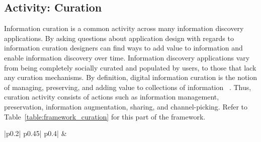 \documentclass[review]{elsarticle}
\begin{document}
{{\subsection{Activity: Curation}
Information curation is a common activity across many information discovery applications. By asking questions about application design with regards to information curation designers can find ways to add value to information and enable information discovery over time. 
%
Information discovery applications vary from being completely socially curated and populated by users, to those that lack any curation mechanisms. 
By definition, digital information curation is the notion of managing, preserving, and adding value to collections of information ~\cite{beagrie2008digital,whittaker2011personal}. Thus, curation activity consists of actions such as information management, preservation, information augmentation, sharing, and channel-picking. Refer to Table~\ref{table:framework_curation} for this part of the framework.

\begin{table}[!htbp]
\small
\begin{tabular}{|p{0.2\linewidth}| p{0.45\linewidth}| p{0.4\linewidth}|}
\hline
{}   &  \\


\end{tabular}
\end{table}}}
\end{document}
